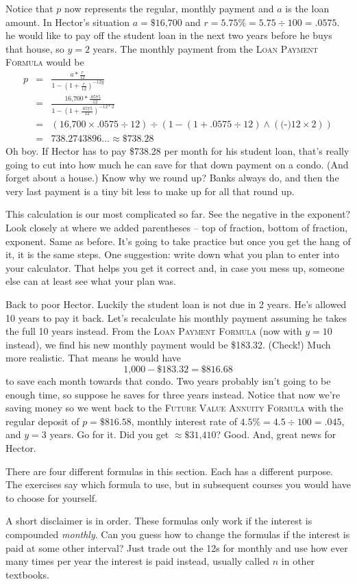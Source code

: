 Notice that $p$ now represents the regular, monthly payment and $a$ is the loan amount.
In Hector's situation $a = \$\text{16,700}$ and $r=5.75\%=5.75 \div 100=.0575$. he would like to pay off the student loan in the next two years before he buys that house, so $y=2$ years.  The monthly payment from the  \textsc{Loan Payment Formula} would be
\begin{eqnarray*}
p & = &   \frac{a  \ast \frac{r}{12}}{1-\left( 1 + \frac{r}{12}\right) ^{-12y}} \\
& = &    \frac{\text{16,700} \ast \frac{.0575}{12}}{1-\left( 1 + \frac{.0575}{12}\right) ^{-12\ast 2}}\\
& =  & \left(\text{16,700} \times .0575 \div 12 \right) \div \left(1-(1+.0575 \div 12) \wedge (\text{(-)}12 \times 2)\right) \\
& =  & 738.2743896\ldots  \approx \$738.28
\end{eqnarray*}
Oh boy.  If Hector has to pay \$738.28 per month for his student loan, that's really going to cut into how much he can save for that down payment on a condo.  (And forget about a house.) Know why we round up?  Banks always do, and then the very last payment is a tiny bit less to make up for all that round up.

This calculation is our most complicated so far. See the negative in the exponent? Look closely at where we added parentheses -- top of fraction, bottom of fraction, exponent.  Same as before.  It's going to take practice but once you get the hang of it, it is the same steps.  One suggestion: write down what you plan to enter into your calculator.  That helps you get it correct and, in case you mess up, someone else can at least see what your plan was. 

Back to poor Hector. Luckily the student loan is not due in 2 years.  He's allowed 10 years to pay it back.  Let's recalculate his monthly payment assuming he takes the full 10 years instead. From the  \textsc{Loan Payment Formula} (now with $y=10$ instead), we find his new monthly payment would be \$183.32.  (Check!) 
Much more realistic.  That means he would have $$\text{1,000} - \$183.32 = \$816.68$$ to save each month towards that condo.  Two years probably isn't going to be enough time, so suppose he saves for three years instead. Notice that now we're saving money so we went back to the \textsc{Future Value Annuity Formula} with the regular deposit of $p=\$816.58$, monthly interest rate of $4.5\% = 4.5 \div 100 = .045$, and $y=3$ years.  
Go for it.  Did you get $ \approx \$\text{31,410}$?  Good.  And, great news for Hector.

There are four different formulas in this section.  Each has a different purpose.  The exercises say which formula to use, but in subsequent courses you would have to choose for yourself.  

A short disclaimer is in order.  These formulas only work if the interest is compounded \emph{monthly}.  Can you guess how to change the formulas if the interest is paid at some other interval?  Just trade out the 12s for monthly and use how ever many times per year the interest is paid instead, usually called $n$ in other textbooks.

